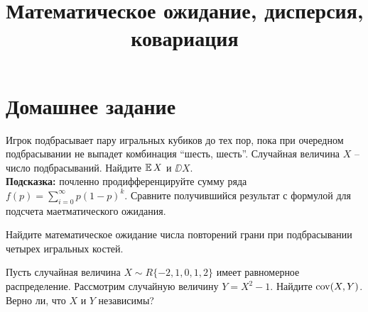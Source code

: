 

\title{Математическое ожидание, дисперсия, ковариация}
\date{\vspace{-1cm}}


\maketitle

\section*{Домашнее задание}

\begin{problem}
    Игрок подбрасывает пару игральных кубиков до тех пор, пока при очередном подбрасывании не выпадет комбинация ``шесть, шесть''.
    Случайная величина $X$ -- число подбрасываний.
    Найдите $\operatorname{\mathbb{E}} X$ и $\DD X$.\\
    \textbf{Подсказка:} почленно продифференцируйте сумму ряда
    $
        f(p) = \sum_{i = 0}^{\infty} p (1 - p)^k.
    $
    Сравните получившийся результат с формулой для подсчета маетматического ожидания.
\end{problem}

\begin{problem}
    Найдите математическое ожидание числа повторений грани при подбрасывании четырех игральных костей.
\end{problem}


\begin{problem}
    Пусть случайная величина $X \sim R\{-2, 1, 0, 1, 2\}$ имеет равномерное распределение.
    Рассмотрим случайную величину $Y = X^2 - 1$.
    Найдите $\operatorname{\mathrm{cov}}(X, Y)$.
    Верно ли, что $X$ и $Y$ независимы?
\end{problem}

